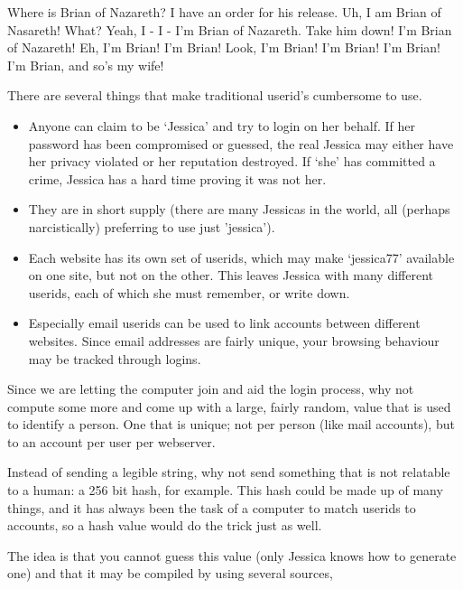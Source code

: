 \begin{dialogue}
	Where is Brian of Nazareth? I have an order for his release.
	Uh, I am Brian of Nasareth!
		What?
	Yeah, I - I - I'm Brian of Nazareth.
	Take him down!
	I'm Brian of Nazareth!
	Eh, I'm Brian!
	I'm Brian!
	Look, I'm Brian!
		I'm Brian!
		I'm Brian!
		I'm Brian, and so's my wife!
\end{dialogue}
There are several things that make traditional userid's cumbersome to use.
\begin{itemize}
\item Anyone can claim to be `Jessica' and try to login on her behalf.
If her password has been compromised or guessed,
the real Jessica may either have her privacy violated or her reputation destroyed.
If `she' has committed a crime, Jessica has a hard time proving it was not her.
\item They are in short supply (there are many Jessicas in the world, all (perhaps narcistically) preferring to use just 'jessica').
\item Each website has its own set of userids, which may make `jessica77' available on one site, but not on the other.
This leaves Jessica with many different userids, each of which she must remember, or write down.
\item Especially email userids can be used to link accounts between different websites.
Since email addresses are fairly unique, your browsing behaviour may be tracked through logins.
\end{itemize}
Since we are letting the computer join and aid the login process, why not compute some more and come up with a large, fairly random, value that is used to identify a person.
One that is unique; not per person (like mail accounts), but to an account per user per webserver.
\par
Instead of sending a legible string, why not send something that is not relatable to a human: a 256 bit hash, for example.
This hash could be made up of many things, and it has always been the task of a computer to match userids to accounts, so a hash value would do the trick just as well.
\par
The idea is that you cannot guess this value
(only Jessica knows how to generate one)
and that it may be compiled by using several sources,
